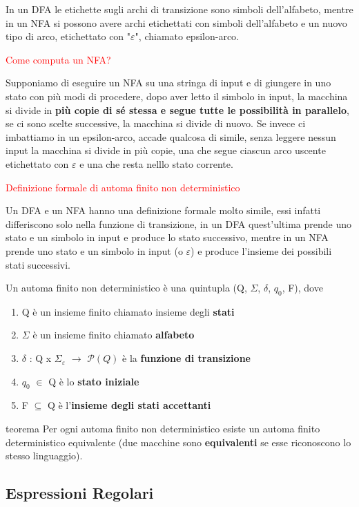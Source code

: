 \documentclass{article}
\begin{document}
In un DFA le etichette sugli archi di transizione sono simboli dell'alfabeto,
mentre in un NFA si possono avere archi etichettati con simboli dell'alfabeto e
un nuovo tipo di arco, etichettato con "$\varepsilon$", chiamato epsilon-arco.

\noindent \textcolor{red}{Come computa un NFA?}

Supponiamo di eseguire un NFA su una stringa di input e di giungere in uno stato
con più modi di procedere, dopo aver letto il simbolo in input, la macchina si
divide in \textbf{più copie di sé stessa e segue tutte le possibilità in
parallelo}, se ci sono scelte successive, la macchina si divide di nuovo. Se
invece ci imbattiamo in un epsilon-arco, accade qualcosa di simile, senza
leggere nessun input la macchina si divide in più copie, una che segue ciascun
arco uscente etichettato con $\varepsilon$ e una che resta nelllo stato
corrente.

\textcolor{red}{Definizione formale di automa finito non deterministico}

Un DFA e un NFA hanno una definizione formale molto simile, essi infatti
differiscono solo nella funzione di transizione, in un DFA quest'ultima prende
uno stato e un simbolo in input e produce lo stato successivo, mentre in un NFA
prende uno stato e un simbolo in input (o $\varepsilon$) e produce l'insieme dei
possibili stati successivi.

Un automa finito non deterministico è una quintupla (Q, $\Sigma$, $\delta$,
$q_0$, F), dove
\begin{enumerate}
    \item Q è un insieme finito chiamato insieme degli \textbf{stati}
    \item $\Sigma$ è un insieme finito chiamato \textbf{alfabeto}
    \item $\delta$ : Q x $\Sigma_\varepsilon$ $\rightarrow$ $\mathcal{P}(Q)$ è
    la \textbf{funzione di transizione}
    \item $q_0$ $\in$ Q è lo \textbf{stato iniziale}
    \item F $\subseteq$ Q è l'\textbf{insieme degli stati accettanti}
\end{enumerate}

\textcolor{green! 50! black}{teorema}
Per ogni automa finito non deterministico esiste un automa finito deterministico
equivalente (due macchine sono \textbf{equivalenti} se esse riconoscono lo
stesso linguaggio).

\subsection{Espressioni Regolari}
\end{document}
